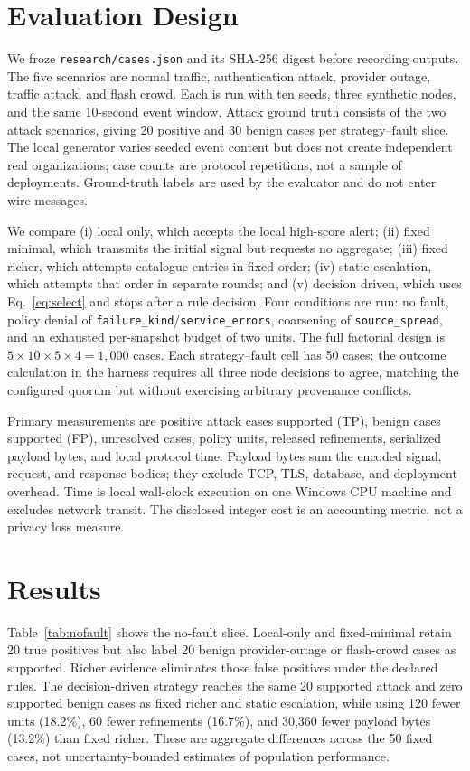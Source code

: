\documentclass[conference,letterpaper]{IEEEtran}
\begin{document}
\section{Evaluation Design}
We froze \texttt{research/cases.json} and its SHA-256 digest before recording outputs. The five scenarios are normal traffic, authentication attack, provider outage, traffic attack, and flash crowd. Each is run with ten seeds, three synthetic nodes, and the same 10-second event window. Attack ground truth consists of the two attack scenarios, giving 20 positive and 30 benign cases per strategy--fault slice. The local generator varies seeded event content but does not create independent real organizations; case counts are protocol repetitions, not a sample of deployments. Ground-truth labels are used by the evaluator and do not enter wire messages.

We compare (i) local only, which accepts the local high-score alert; (ii) fixed minimal, which transmits the initial signal but requests no aggregate; (iii) fixed richer, which attempts catalogue entries in fixed order; (iv) static escalation, which attempts that order in separate rounds; and (v) decision driven, which uses Eq.~\ref{eq:select} and stops after a rule decision. Four conditions are run: no fault, policy denial of \texttt{failure\_kind}/\texttt{service\_errors}, coarsening of \texttt{source\_spread}, and an exhausted per-snapshot budget of two units. The full factorial design is $5\times10\times5\times4=1{,}000$ cases. Each strategy--fault cell has 50 cases; the outcome calculation in the harness requires all three node decisions to agree, matching the configured quorum but without exercising arbitrary provenance conflicts.

Primary measurements are positive attack cases supported (TP), benign cases supported (FP), unresolved cases, policy units, released refinements, serialized payload bytes, and local protocol time. Payload bytes sum the encoded signal, request, and response bodies; they exclude TCP, TLS, database, and deployment overhead. Time is local wall-clock execution on one Windows CPU machine and excludes network transit. The disclosed integer cost is an accounting metric, not a privacy loss measure.

\section{Results}
Table~\ref{tab:nofault} shows the no-fault slice. Local-only and fixed-minimal retain 20 true positives but also label 20 benign provider-outage or flash-crowd cases as supported. Richer evidence eliminates those false positives under the declared rules. The decision-driven strategy reaches the same 20 supported attack and zero supported benign cases as fixed richer and static escalation, while using 120 fewer units (18.2\%), 60 fewer refinements (16.7\%), and 30,360 fewer payload bytes (13.2\%) than fixed richer. These are aggregate differences across the 50 fixed cases, not uncertainty-bounded estimates of population performance.
\end{document}
